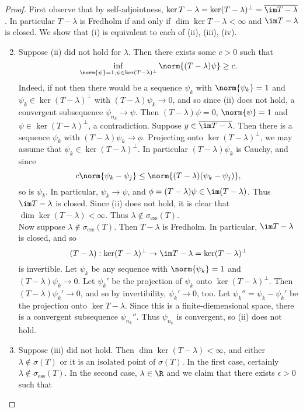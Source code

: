 \documentclass[12pt]{article}
\newcommand{\ess}{\sigma_{\text{ess}}}
\begin{document}
\begin{proof}First observe that by self-adjointness, $\ker T-\lambda = \ker (T-\lambda)^{\bot} = \overline{\im T-\lambda}$. In particular $T-\lambda$ is Fredholm if and only if $\dim \ker T-\lambda < \infty$ and $\im T-\lambda$ is closed. We show that (i) is equivalent to each of (ii), (iii), (iv).
\begin{enumerate}[label = (\roman*)]
\setcounter{enumi}{1}
\item
Suppose (ii) did not hold for $\lambda$. Then there exists some $c > 0$ such that
\[\inf_{\norm{\psi} = 1, \psi \in \ker (T-\lambda)^{\bot}} \norm{(T-\lambda)\psi} \geq c.\] Indeed, if not then there would be a sequence $\psi_k$ with $\norm{\psi_k} = 1$ and $\psi_k \in \ker (T-\lambda)^{\bot}$ with $(T-\lambda)\psi_k \to 0$, and so since (ii) does not hold, a convergent subsequence $\psi_{n_k} \to \psi$. Then $(T-\lambda)\psi = 0$, $\norm{\psi} = 1$ and $\psi \in \ker (T-\lambda)^{\bot}$, a contradiction. Suppose $y \in \overline{\im T-\lambda}$. Then there is a sequence $\psi_k$ with $(T-\lambda)\psi_k \to \phi$. Projecting onto $\ker (T-\lambda)^\bot$, we may assume that $\psi_k \in \ker (T-\lambda)^{\bot}$. In particular $(T-\lambda)\psi_k$ is Cauchy, and since
\[c\norm{\psi_k-\psi_j} \leq \norm{(T-\lambda)(\psi_k-\psi_j)},\] so is $\psi_k$. In particular, $\psi_k \to \psi$, and $\phi = (T-\lambda)\psi \in \im (T-\lambda)$. Thus $\im T-\lambda$ is closed. Since (ii) does not hold, it is clear that $\dim \ker (T-\lambda) < \infty$. Thus $\lambda \not \in \ess(T)$.\\[2ex]
Now suppose $\lambda \not \in \ess(T)$. Then $T-\lambda$ is Fredholm. In particular, $\im T-\lambda$ is closed, and so 
\[(T-\lambda):\ker (T-\lambda)^{\bot} \to \im T-\lambda =\ker (T-\lambda)^{\bot}\] is invertible.
Let $\psi_k$ be any sequence with $\norm{\psi_k} = 1$ and $(T-\lambda)\psi_k \to 0$. Let $\psi_k'$ be the projection of $\psi_k$ onto $\ker (T-\lambda)^\bot$. Then $(T-\lambda)\psi_k' \to 0$, and so by invertibility, $\psi_k' \to 0$, too. Let $\psi_k'' = \psi_k-\psi_k'$ be the projection onto $\ker T-\lambda$. Since this is a finite-diemensional space, there is a convergent subsequence $\psi_{n_k}''$. Thus $\psi_{n_k}$ is convergent, so (ii) does not hold.
\item Suppose (iii) did not hold. Then $\dim \ker (T-\lambda) < \infty$, and either $\lambda \not \in \sigma(T)$ or it is an isolated point of $\sigma(T)$. In the first case, certainly $\lambda \not \in \ess(T)$. In the second case, $\lambda \in \R$ and we claim that there exists $\epsilon > 0$ such that 

\end{enumerate}
\end{proof}
\end{document}
